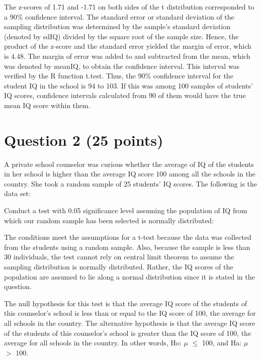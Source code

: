 \documentclass[12pt,letterpaper]{article}
\begin{document}
\noindent The z-scores of 1.71 and -1.71 on both sides of the t distribution corresponded to a 90\% confidence interval. The standard error or standard deviation of the sampling distribution was determined by the sample's standard deviation (denoted by sdIQ) divided by the square root of the sample size. Hence, the product of the z-score and the standard error yielded the margin of error, which is 4.48. The margin of error was added to and subtracted from the mean, which was denoted by meanIQ, to obtain the confidence interval. This interval was verified by the R function t.test.
\noindent Thus, the 90\% confidence interval for the student IQ in the school is 94 to 103. If this was among 100 samples of students' IQ scores, confidence intervals calculated from 90 of them would have the true mean IQ score within them.

\vspace{1cm}
\section*{Question 2 (25 points)}
A private school counselor was curious whether  the average of IQ of the students in her school is higher than the average IQ score 100 among all the schools in the country. She took a random sample of 25 students' IQ scores. The following is the data set:
\vspace{.5cm}
  
\vspace{.5cm}

\noindent Conduct a test with 0.05 significance level assuming the population of IQ from which our random sample has been selected is normally distributed:

\vspace{.5cm}

\noindent The conditions meet the assumptions for a t-test because the data was collected from the students using a random sample. Also, because the sample is less than 30 individuals, the test cannot rely on central limit theorem to assume the sampling distribution is normally distributed. Rather, the IQ scores of the population are assumed to lie along a normal distribution since it is stated in the question.

\vspace{.5cm}

\noindent The null hypothesis for this test is that the average IQ score of the students of this counselor's school is less than or equal to the IQ score of 100, the average for all schools in the country. The alternative hypothesis is that the average IQ score of the students of this counselor's school is greater than the IQ score of 100, the average for all schools in the country. In other words, Ho: $\mu $ $\leq $ 100, and Ha: $\mu $ $> $  100.
\end{document}
